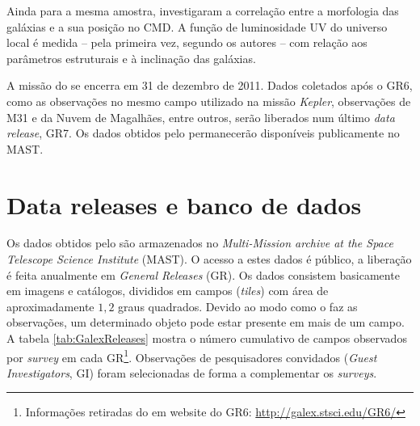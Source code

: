 Ainda para a mesma amostra, \citet{Schiminovich2007} investigaram a correlação
entre a morfologia das galáxias e a sua posição no CMD. A função de luminosidade
UV do universo local é medida -- pela primeira vez, segundo os autores -- com
relação aos parâmetros estruturais e à inclinação das galáxias.

A missão do \galex se encerra em 31 de dezembro de 2011. Dados coletados após o
GR6, como as observações no mesmo campo utilizado na missão {\em Kepler},
observações de M31 e da Nuvem de Magalhães, entre outros, serão liberados num
último {\em data release}, GR7. Os dados obtidos pelo \galex permanecerão
disponíveis publicamente no MAST.




\section{Data releases e banco de dados}
\label{sec:Galex:BancoDeDados}

Os dados obtidos pelo \galex são armazenados no {\em Multi-Mission archive at
the Space Telescope Science Institute} (MAST). O acesso a estes dados é público,
a liberação é feita anualmente em {\em General Releases} (GR). Os dados
consistem basicamente em imagens e catálogos, divididos em campos ({\em tiles})
com área de aproximadamente $1,2$ graus quadrados. Devido ao modo como o \galex
faz as observações, um determinado objeto pode estar presente em mais de um
campo. A tabela \ref{tab:GalexReleases} mostra o número cumulativo de campos
observados por {\em survey} em cada GR\footnote{Informações retiradas do {em
website} do GR6: \url{http://galex.stsci.edu/GR6/}}. Observações de
pesquisadores convidados ({\em Guest Investigators}, GI) foram selecionadas de
forma a complementar os {\em surveys}.

